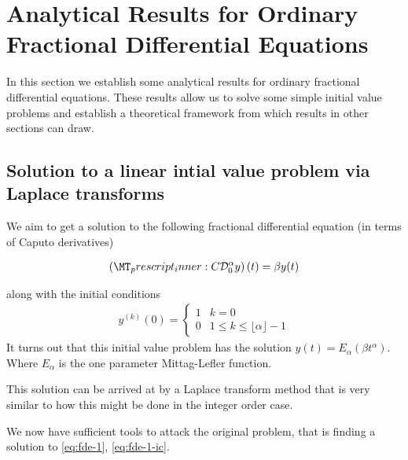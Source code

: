 \section{Analytical Results for Ordinary Fractional Differential Equations}
In this section we establish some analytical results for ordinary fractional differential equations. These results allow us to solve some simple initial value problems and establish a theoretical framework from which results in other sections can draw.

\subsection{Solution to a linear intial value problem via Laplace transforms}
We aim to get a solution to the following fractional differential equation (in terms of Caputo derivatives)

\begin{align}
	\label{eq:fde-1}
	\left( \prescript{C}{}{\mathcal{D}_0^\alpha}y \right)(t) = \beta y(t) 
\end{align}

along with the initial conditions 
\begin{align}
	\label{eq:fde-1-ic}
	y^{(k)}(0) = 
	\begin{cases}
		1 & k = 0 \\
		0 & 1 \leq k \leq \lfloor\alpha \rfloor - 1  
	\end{cases}
\end{align}
It turns out that this initial value problem has the solution $ y(t) = E_\alpha \left( \beta t^\alpha \right) $. Where $ E_\alpha $ is the one parameter Mittag-Lefler function.

This solution can be arrived at by a Laplace transform method that is very similar to how this might be done in the integer order case.




We now have sufficient tools to attack the original problem, that is finding a solution to \eqref{eq:fde-1}, \eqref{eq:fde-1-ic}.

